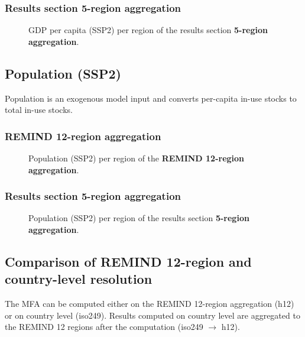 \subsubsection{Results section 5-region aggregation}
\begin{figure}[htbp]
    \centering
    \caption{GDP per capita (SSP2) per region of the results section \textbf{5-region aggregation}.}
    \label{fig:gdppc_agg5}
\end{figure}

\clearpage

\subsection{Population (SSP2)} \label{sec:add_pop}

Population is an exogenous model input and converts per-capita in-use stocks to total in-use stocks.

\subsubsection{REMIND 12-region aggregation}
\begin{figure}[htbp]
    \centering
    \caption{Population (SSP2) per region of the \textbf{REMIND 12-region aggregation}.}
    \label{fig:pop_h12}
\end{figure}

\subsubsection{Results section 5-region aggregation}
\begin{figure}[htbp]
    \centering
    \caption{Population (SSP2) per region of the results section \textbf{5-region aggregation}.}
    \label{fig:pop_agg5}
\end{figure}

\clearpage

\subsection{Comparison of REMIND 12-region and country-level resolution} \label{sec:comparison_country_level}

The MFA can be computed either on the REMIND 12-region aggregation (h12) or on country level (iso249). Results computed on country level are aggregated to the REMIND 12 regions after the computation (iso249 $\rightarrow$ h12).

